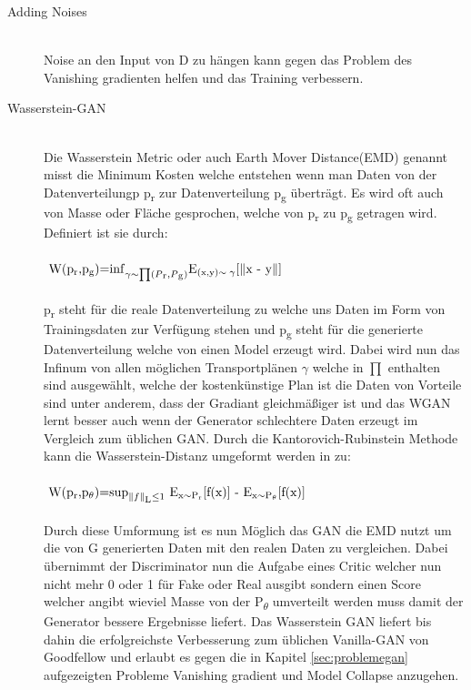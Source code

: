 \documentclass{llncs}
\begin{document}
\begin{description}
	\item[Adding Noises]
	~\\
	Noise an den Input von D zu hängen kann gegen das Problem des Vanishing gradienten helfen und das Training verbessern\cite{improvingan}.\\
	
	\item[Wasserstein-GAN]
	~\\
	Die Wasserstein Metric oder auch Earth Mover Distance(EMD) genannt misst die Minimum Kosten welche entstehen wenn man Daten von der Datenverteilungp p\textsubscript{r} zur Datenverteilung p\textsubscript{g} überträgt. Es wird oft auch von Masse oder Fläche gesprochen, welche von p\textsubscript{r} zu p\textsubscript{g} getragen wird. Definiert ist sie durch:
	\\\\
	\begin{math} 
	$
	W(p\textsubscript{r},p\textsubscript{g})=$\inf_{\gamma\sim\prod(P\textsubscript{r},P\textsubscript{g})}$E\textsubscript{(x,y)$\sim\gamma$}[$\parallel$x - y$\parallel$]
	$
	\end{math}
	\\\\
	p\textsubscript{r} steht für die reale Datenverteilung zu welche uns Daten im Form von Trainingsdaten zur Verfügung stehen und p\textsubscript{g} steht für die generierte Datenverteilung welche von einen Model erzeugt wird. Dabei wird nun das Infinum von allen möglichen Transportplänen $\gamma$ welche in $\prod$ enthalten sind ausgewählt, welche der kostenkünstige Plan ist die Daten von   Vorteile sind unter anderem, dass der Gradiant gleichmäßiger ist und das WGAN lernt besser auch wenn der Generator schlechtere Daten erzeugt im Vergleich zum üblichen GAN. Durch die Kantorovich-Rubinstein Methode kann die Wasserstein-Distanz umgeformt werden in zu:
	\\\\
	\begin{math} 
	$
	W(p\textsubscript{r},p\textsubscript{$\theta$})=$\sup_{\parallel f \parallel \textsubscript{L}\leq 1}$ E\textsubscript{x$\sim$P\textsubscript{r}}[f(x)] - E\textsubscript{x$\sim$P\textsubscript{$\theta$}}[f(x)]
	$
	\end{math}
	\\\\
	Durch diese Umformung ist es nun Möglich das GAN die EMD nutzt um die von G generierten Daten mit den realen Daten zu vergleichen. Dabei übernimmt der Discriminator nun die Aufgabe eines Critic welcher nun nicht mehr 0 oder 1 für Fake oder Real ausgibt sondern einen Score welcher angibt wieviel Masse von der P\textsubscript{$\theta$} umverteilt werden muss damit der Generator bessere Ergebnisse liefert. Das Wasserstein GAN liefert bis dahin die erfolgreichste Verbesserung zum üblichen Vanilla-GAN von Goodfellow und erlaubt es gegen die in Kapitel \ref{sec:problemegan} aufgezeigten Probleme Vanishing gradient und Model Collapse anzugehen. 
\end{description}
\end{document}
